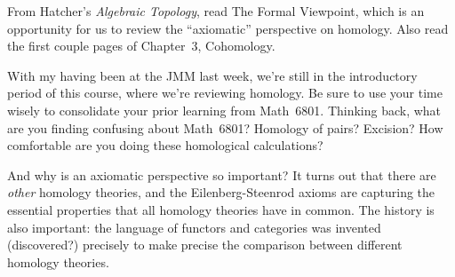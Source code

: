 \documentclass{homework}
\author{Jim Fowler}
\date{Week 2: Homology and coefficients}
\begin{document}
\maketitle

From Hatcher's \textit{Algebraic Topology}, read  The
Formal Viewpoint, which is an opportunity for us to review the
``axiomatic'' perspective on homology.  Also read the first couple
pages of Chapter~3, Cohomology.

With my having been at the JMM last week, we're still in the
introductory period of this course, where we're reviewing homology.
Be sure to use your time wisely to consolidate your prior learning
from Math~6801.  Thinking back, what are you finding confusing about
Math~6801?  Homology of pairs?  Excision?  How comfortable are you
doing these homological calculations?

And why is an axiomatic perspective so important?  It turns out that
there are \textit{other} homology theories, and the Eilenberg-Steenrod
axioms are capturing the essential properties that all homology
theories have in common.  The history is also important: the language
of functors and categories was invented (discovered?) precisely to
make precise the comparison between different homology theories.
\end{document}
